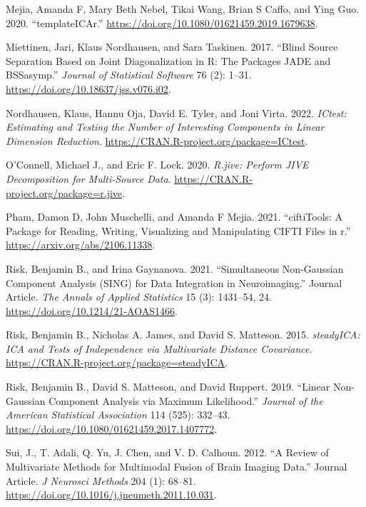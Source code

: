 \begin{CSLReferences}{1}{0}
\leavevmode{}%
Mejia, Amanda F, Mary Beth Nebel, Tikai Wang, Brian S Caffo, and Ying Guo. 2020. {``{templateICAr}.''} \url{https://doi.org/10.1080/01621459.2019.1679638}.

\leavevmode{}%
Miettinen, Jari, Klaus Nordhausen, and Sara Taskinen. 2017. {``Blind Source Separation Based on Joint Diagonalization in {R}: The Packages {JADE} and {BSSasymp}.''} \emph{Journal of Statistical Software} 76 (2): 1--31. \url{https://doi.org/10.18637/jss.v076.i02}.

\leavevmode{}%
Nordhausen, Klaus, Hannu Oja, David E. Tyler, and Joni Virta. 2022. \emph{ICtest: Estimating and Testing the Number of Interesting Components in Linear Dimension Reduction}. \url{https://CRAN.R-project.org/package=ICtest}.

\leavevmode{}%
O'Connell, Michael J., and Eric F. Lock. 2020. \emph{R.jive: Perform JIVE Decomposition for Multi-Source Data}. \url{https://CRAN.R-project.org/package=r.jive}.

\leavevmode{}%
Pham, Damon D, John Muschelli, and Amanda F Mejia. 2021. {``ciftiTools: A Package for Reading, Writing, Visualizing and Manipulating CIFTI Files in r.''} \url{https://arxiv.org/abs/2106.11338}.

\leavevmode{}%
Risk, Benjamin B., and Irina Gaynanova. 2021. {``Simultaneous Non-Gaussian Component Analysis (SING) for Data Integration in Neuroimaging.''} Journal Article. \emph{The Annals of Applied Statistics} 15 (3): 1431--54, 24. \url{https://doi.org/10.1214/21-AOAS1466}.

\leavevmode{}%
Risk, Benjamin B., Nicholas A. James, and David S. Matteson. 2015. \emph{steadyICA: ICA and Tests of Independence via Multivariate Distance Covariance}. \url{https://CRAN.R-project.org/package=steadyICA}.

\leavevmode{}%
Risk, Benjamin B., David S. Matteson, and David Ruppert. 2019. {``Linear Non-Gaussian Component Analysis via Maximum Likelihood.''} \emph{Journal of the American Statistical Association} 114 (525): 332--43. \url{https://doi.org/10.1080/01621459.2017.1407772}.

\leavevmode{}%
Sui, J., T. Adali, Q. Yu, J. Chen, and V. D. Calhoun. 2012. {``A Review of Multivariate Methods for Multimodal Fusion of Brain Imaging Data.''} Journal Article. \emph{J Neurosci Methods} 204 (1): 68--81. \url{https://doi.org/10.1016/j.jneumeth.2011.10.031}.


\end{CSLReferences}
